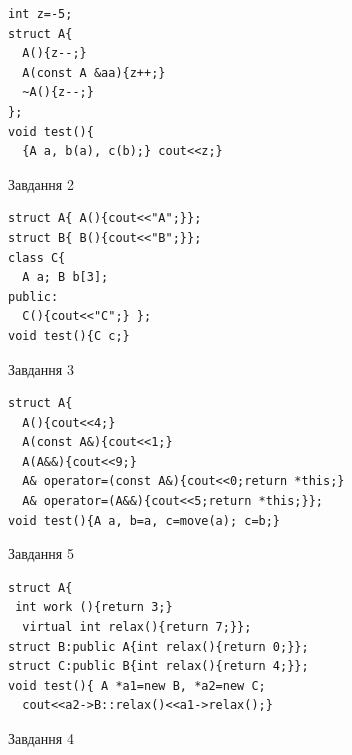 \documentclass[12pt, ukrainian]{article}
\begin{document}
{{\begin{minipage}[t]{11cm}
\begin{verbatim}
int z=-5;
struct A{
  A(){z--;}
  A(const A &aa){z++;}
  ~A(){z--;}
};
void test(){
  {A a, b(a), c(b);} cout<<z;}
\end{verbatim}            


               
{\begin{center}Завдання {2}\end{center}}
\vspace{-6mm}

\begin{verbatim}
struct A{ A(){cout<<"A";}};
struct B{ B(){cout<<"B";}};
class C{
  A a; B b[3];
public:
  C(){cout<<"C";} };
void test(){C c;}
\end{verbatim}            


               
{\begin{center}Завдання {3}\end{center}}
\vspace{-6mm}

\begin{verbatim}
struct A{
  A(){cout<<4;}
  A(const A&){cout<<1;}
  A(A&&){cout<<9;}
  A& operator=(const A&){cout<<0;return *this;}
  A& operator=(A&&){cout<<5;return *this;}};
void test(){A a, b=a, c=move(a); c=b;}
\end{verbatim}            


               
{\begin{center}Завдання {5}\end{center}}
\vspace{-6mm}

\begin{verbatim}
struct A{
 int work (){return 3;}
  virtual int relax(){return 7;}};
struct B:public A{int relax(){return 0;}};
struct C:public B{int relax(){return 4;}};
void test(){ A *a1=new B, *a2=new C;
  cout<<a2->B::relax()<<a1->relax();}
\end{verbatim}            


\end{minipage}
\vline \hspace{8mm}
\begin{minipage}[t]{7cm}
               
{\begin{center}Завдання {4}\end{center}}
\vspace{-6mm}


\end{minipage}}}
\end{document}
